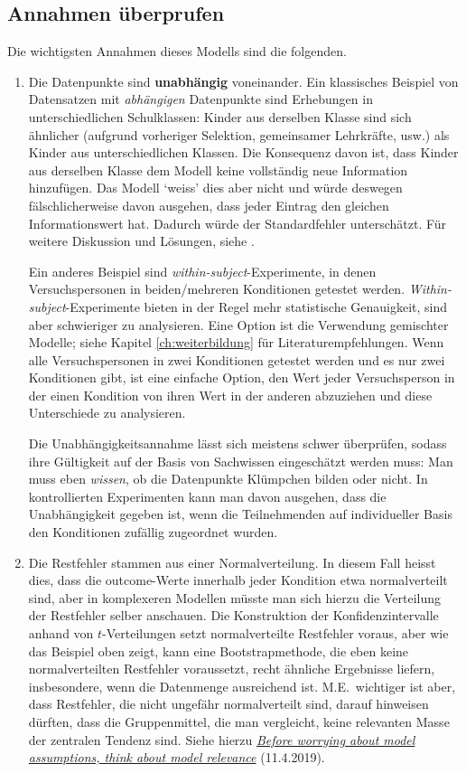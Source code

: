 \documentclass[oneside, 10pt]{book}\usepackage[]{graphicx}\usepackage[]{xcolor}
\begin{document}
\subsection{Annahmen überprufen}
Die wichtigsten Annahmen dieses Modells sind die folgenden.
\begin{enumerate}
  \item Die Datenpunkte sind \textbf{unabhängig} voneinander.
  Ein klassisches Beispiel von Datensatzen mit \emph{abhängigen}
  Datenpunkte sind Erhebungen in unterschiedlichen Schulklassen:
  Kinder aus derselben Klasse sind sich ähnlicher (aufgrund
  vorheriger Selektion, gemeinsamer Lehrkräfte, usw.) als Kinder
  aus unterschiedlichen Klassen. Die Konsequenz davon ist,
  dass Kinder aus derselben Klasse dem Modell keine vollständig
  neue Information hinzufügen. Das Modell `weiss' dies aber nicht
  und würde deswegen fälschlicherweise davon ausgehen, dass
  jeder Eintrag den gleichen Informationswert hat. Dadurch würde
  der Standardfehler unterschätzt.
  Für weitere Diskussion und Lösungen, siehe \citet{Vanhove2015}.

  Ein anderes Beispiel sind \textit{within-subject}-Experimente,
  in denen Versuchspersonen in beiden/mehreren Konditionen getestet
  werden. \textit{Within-subject}-Experimente bieten in der Regel
  mehr statistische Genauigkeit, sind aber schwieriger zu analysieren.
  Eine Option ist die Verwendung gemischter Modelle;
  siehe Kapitel \ref{ch:weiterbildung} für Literaturempfehlungen.
  Wenn alle Versuchspersonen in zwei Konditionen getestet
  werden und es nur zwei Konditionen gibt, ist eine einfache Option,
  den Wert jeder Versuchsperson in der einen Kondition von ihren Wert
  in der anderen abzuziehen und diese Unterschiede zu analysieren.

  Die Unabhängigkeitsannahme lässt sich meistens schwer überprüfen,
  sodass ihre Gültigkeit auf der Basis von Sachwissen eingeschätzt
  werden muss: Man muss eben \emph{wissen}, ob die Datenpunkte
  Klümpchen bilden oder nicht.
  In kontrollierten Experimenten kann man davon ausgehen,
  dass die Unabhängigkeit gegeben ist, wenn die Teilnehmenden
  auf individueller Basis den Konditionen zufällig zugeordnet wurden.

  \item Die Restfehler stammen aus einer Normalverteilung.
  In diesem Fall heisst dies, dass die outcome-Werte innerhalb
  jeder Kondition etwa normalverteilt sind, aber in komplexeren
  Modellen müsste man sich hierzu die Verteilung der Restfehler selber
  anschauen. Die Konstruktion der Konfidenzintervalle anhand
  von $t$-Verteilungen setzt normalverteilte Restfehler voraus,
  aber wie das Beispiel oben zeigt, kann eine Bootstrapmethode,
  die eben keine normalverteilten Restfehler voraussetzt, recht
  ähnliche Ergebnisse liefern, insbesondere, wenn die Datenmenge
  ausreichend ist. M.E.\ wichtiger ist aber, dass Restfehler, die
  nicht ungefähr normalverteilt sind, darauf hinweisen dürften, dass
  die Gruppenmittel, die man vergleicht, keine relevanten Masse
  der zentralen Tendenz sind.
  Siehe hierzu
\href{https://janhove.github.io/analysis/2019/04/11/assumptions-relevance}{\textit{Before worrying about model assumptions, think about model relevance}} (11.4.2019).


\end{enumerate}
\end{document}
